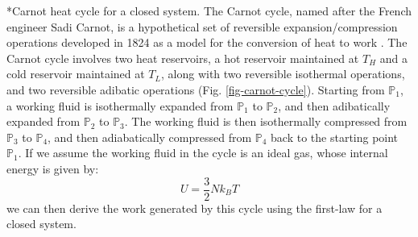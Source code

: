 \documentclass[11pt]{article}
\makeatletter
\theoremstyle{definition}
\renewcommand\subsection{\@startsection
	{subsection}{2}{0mm}
	{-0.05in}
	{0.5\baselineskip}
	{\normalfont\normalsize\bfseries}}
\makeatother
\begin{document}
\subsection*{Carnot heat cycle for a closed system.}
The Carnot cycle, named after the French engineer Sadi Carnot, is a hypothetical set of reversible expansion/compression operations
developed in 1824 as a model for the conversion of heat to work \cite{CARNOT_1824}.
The Carnot cycle involves two heat reservoirs, a hot reservoir maintained at $T_{H}$ and a cold reservoir maintained at $T_{L}$, along with two reversible isothermal operations,
and two reversible adibatic operations (Fig. \ref{fig-carnot-cycle}).
Starting from $\mathbb{P}_{1}$, a working fluid is
isothermally expanded from $\mathbb{P}_{1}$ to $\mathbb{P}_{2}$, and then adibatically expanded from $\mathbb{P}_{2}$ to $\mathbb{P}_{3}$.
The working fluid is then isothermally compressed from $\mathbb{P}_{3}$ to $\mathbb{P}_{4}$, and then adiabatically compressed from $\mathbb{P}_{4}$ back to the starting point $\mathbb{P}_{1}$.
If we assume the working fluid in the cycle is an ideal gas, whose internal energy is given by:
\begin{equation}\label{eqn:internal-energy-for-ideal-gas}
U = \frac{3}{2}Nk_{B}T
\end{equation} we can then derive the work generated by this cycle using the first-law for a closed system.
\end{document}
